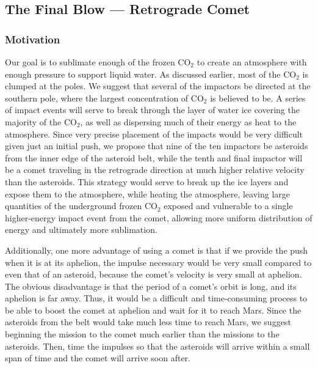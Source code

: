 \documentclass[a4paper]{article}
\begin{document}
	\subsection{The Final Blow --- Retrograde Comet}
	\subsubsection{Motivation}
	Our goal is to sublimate enough of the frozen CO$_2$ to create an atmosphere with enough pressure to support liquid water. As discussed earlier, most of the CO$_2$ is clumped at the poles. We suggest that several of the impactors be directed at the southern pole, where the largest concentration of CO$_2$ is believed to be. A series of impact events will serve to break through the layer of water ice covering the majority of the CO$_2$, as well as dispersing much of their energy as heat to the atmosphere. Since very precise placement of the impacts would be very difficult given just an initial push, we propose that nine of the ten impactors be asteroids from the inner edge of the asteroid belt, while the tenth and final impactor will be a comet traveling in the retrograde direction at much higher relative velocity than the asteroids. This strategy would serve to break up the ice layers and expose them to the atmosphere, while heating the atmosphere, leaving large quantities of the underground frozen CO$_2$ exposed and vulnerable to a single higher-energy impact event from the comet, allowing more uniform distribution of energy and ultimately more sublimation.
	
	Additionally, one more advantage of using a comet is that if we provide the push when it is at its aphelion, the impulse necessary would be very small compared to even that of an asteroid, because the comet's velocity is very small at aphelion. The obvious disadvantage is that the period of a comet's orbit is long, and its aphelion is far away. Thus, it would be a difficult and time-consuming process to be able to boost the comet at aphelion and wait for it to reach Mars. Since the asteroids from the belt would take much less time to reach Mars, we suggest beginning the mission to the comet much earlier than the missions to the asteroids. Then, time the impulses so that the asteroids will arrive within a small span of time and the comet will arrive soon after.
\end{document}
